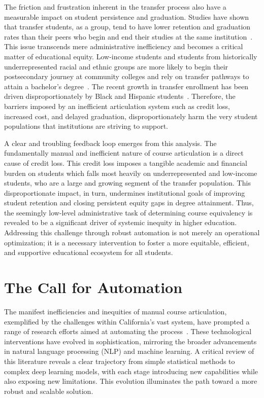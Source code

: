 \begin{introduction}
    The friction and frustration inherent in the transfer process also have a measurable impact on student persistence and graduation. Studies have shown that transfer students, as a group, tend to have lower retention and graduation rates than their peers who begin and end their studies at the same institution~\cite{porter1999}. This issue transcends mere administrative inefficiency and becomes a critical matter of educational equity. Low-income students and students from historically underrepresented racial and ethnic groups are more likely to begin their postsecondary journey at community colleges and rely on transfer pathways to attain a bachelor's degree~\cite{ace2025}. The recent growth in transfer enrollment has been driven disproportionately by Black and Hispanic students~\cite{nscnews2023}. Therefore, the barriers imposed by an inefficient articulation system such as credit loss, increased cost, and delayed graduation, disproportionately harm the very student populations that institutions are striving to support.

    A clear and troubling feedback loop emerges from this analysis. The fundamentally manual and inefficient nature of course articulation is a direct cause of credit loss. This credit loss imposes a tangible academic and financial burden on students which falls most heavily on underrepresented and low-income students, who are a large and growing segment of the transfer population. This disproportionate impact, in turn, undermines institutional goals of improving student retention and closing persistent equity gaps in degree attainment. Thus, the seemingly low-level administrative task of determining course equivalency is revealed to be a significant driver of systemic inequity in higher education. Addressing this challenge through robust automation is not merely an operational optimization; it is a necessary intervention to foster a more equitable, efficient, and supportive educational ecosystem for all students.

    \section{The Call for Automation}\label{sec:automation}
    The manifest inefficiencies and inequities of manual course articulation, exemplified by the challenges within California's vast system, have prompted a range of research efforts aimed at automating the process~\cite{ma_course_recommendation_2017, PardosCourse2Vec2019, pardos-articulation-2019, JiangPardosMulti2VecEDM2020,XuPardosSubwordEmbeddings2024}. These technological interventions have evolved in sophistication, mirroring the broader advancements in natural language processing (NLP) and machine learning. A critical review of this literature reveals a clear trajectory from simple statistical methods to complex deep learning models, with each stage introducing new capabilities while also exposing new limitations. This evolution illuminates the path toward a more robust and scalable solution.


\end{introduction}
